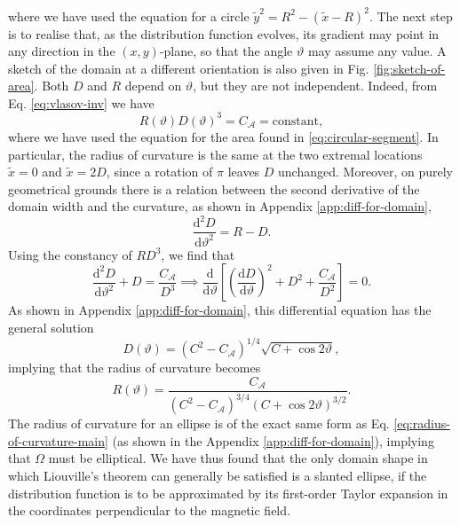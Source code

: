 where we have used the equation for a circle $\tilde{y}^2 = R^2 - (\tilde{x} - R)^2 $. The next step is to realise that, as the distribution function evolves, its gradient may point in any direction in the $(x,y)$-plane, so that the angle $\vartheta$ may assume any value. A sketch of the domain at a different orientation is also given in Fig. \ref{fig:sketch-of-area}. Both $D$ and $R$ depend on $\vartheta$, but they are not independent. Indeed, from Eq. \eqref{eq:vlasov-inv}  we have
\begin{equation}
    R(\vartheta)D(\vartheta)^3 = C_\mathcal{A} = \mathrm{constant},
\end{equation}
where we have used the equation for the area found in \eqref{eq:circular-segment}. In particular, the radius of curvature is the same at the two extremal locations $\tilde{x}=0$ and $\tilde{x}=2D$, since a rotation of $\pi$ leaves $D$ unchanged. Moreover, on purely geometrical grounds there is a relation between the second derivative of the domain width and the curvature, as shown in Appendix \ref{app:diff-for-domain},
\begin{equation}
    \frac{\mathrm{d}^2 D}{\mathrm{d} \vartheta^2} = R - D.
\end{equation}
Using the constancy of $RD^3$, we find that
\begin{equation}
    \frac{\mathrm{d}^2 D}{\mathrm{d} \vartheta^2} + D = \frac{C_\mathcal{A}}{D^3} \implies \frac{\mathrm{d}}{\mathrm{d} \vartheta} \left[\left(\frac{\mathrm{d} D}{\mathrm{d} \vartheta}\right)^2 + D^2 + \frac{C_\mathcal{A}}{D^2} \right]=0.
\end{equation}
As shown in Appendix \ref{app:diff-for-domain}, this differential equation has the general solution
\begin{equation}
    D(\vartheta) = (C^2-C_\mathcal{A})^{1/4}\sqrt{C + \cos 2 \vartheta},
\end{equation}
implying that the radius of curvature becomes
\begin{equation}
    R(\vartheta) = \frac{C_\mathcal{A}}{(C^2-C_\mathcal{A})^{3/4}(C + \cos 2 \vartheta)^{3/2}}.
    \label{eq:radius-of-curvature-main}
\end{equation}
The radius of curvature for an ellipse is of the exact same form as Eq. \eqref{eq:radius-of-curvature-main} (as shown in the Appendix \ref{app:diff-for-domain}), implying that $\Omega$ must be elliptical. We have thus found that the only domain shape in which Liouville's theorem can generally be satisfied is a slanted ellipse, if the distribution function is to be approximated by its first-order Taylor expansion in the coordinates perpendicular to the magnetic field.

